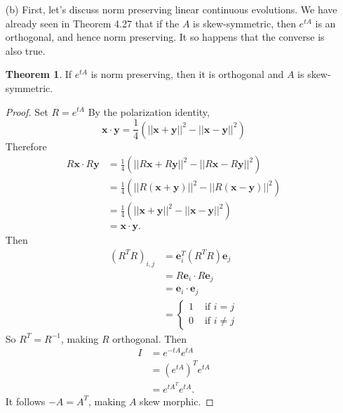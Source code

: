 \documentclass{article}
\theoremstyle{definition}
\newtheorem{theorem}{Theorem}[section]
\begin{document}
\begin{itemize}
	\item[(b)]
		First, let's discuss norm preserving linear continuous
		evolutions.
		We have already seen in Theorem 4.27 that if the $A$ is
		skew-symmetric, then $e^{tA}$ is an orthogonal, and hence norm
		preserving. It so happens
		that the converse is also true.

		\begin{theorem} \label{norm_preserving_skew_symmetric}
			If $e^{tA}$ is norm preserving, then it is orthogonal
			and $A$ is skew-symmetric.
		\end{theorem}
		\begin{proof}
			Set $R = e^{tA}$
			By the polarization identity,
			\[
				\mathbf{x} \cdot \mathbf{y} = \frac{1}{4}
				(||\mathbf{x} + \mathbf{y}||^2 - ||\mathbf{x} -
				\mathbf{y}||^2)
			\]
			Therefore
			\begin{align*}
				R\mathbf{x} \cdot R\mathbf{y} &= \frac{1}{4}
				(||R\mathbf{x} + R\mathbf{y}||^2 - ||R\mathbf{x}
				- R\mathbf{y}||^2) \\
				&= \frac{1}{4} (||R(\mathbf{x} + \mathbf{y})||^2
				- ||R(\mathbf{x}
				- \mathbf{y})||^2) \\
				&= \frac{1}{4} (||\mathbf{x} + \mathbf{y}||^2 -
				||\mathbf{x} - \mathbf{y}||^2) \\
				&= \mathbf{x} \cdot \mathbf{y}.
			\end{align*}
			Then 
			\begin{align*}
				(R^T R)_{i,j} &= \mathbf{e}_i^T (R^T R)\mathbf{e}_j\\
				&= R\mathbf{e}_i \cdot R\mathbf{e}_j  \\
				&= \mathbf{e}_i \cdot \mathbf{e}_j \\
				&= \begin{cases}
					1 & \text{ if } i = j \\
					0 & \text{ if } i \neq j
				\end{cases}
			\end{align*}
			So $R^T = R^{-1}$, making $R$ orthogonal.
			Then
			\begin{align*}
				I &= e^{-tA} e^{tA} \\
				&= (e^{tA})^T e^{tA} \\
				&= e^{tA^T} e^{tA}.
			\end{align*}
			It follows $-A = A^T$, making $A$ skew morphic.
		\end{proof}


\end{itemize}
\end{document}

